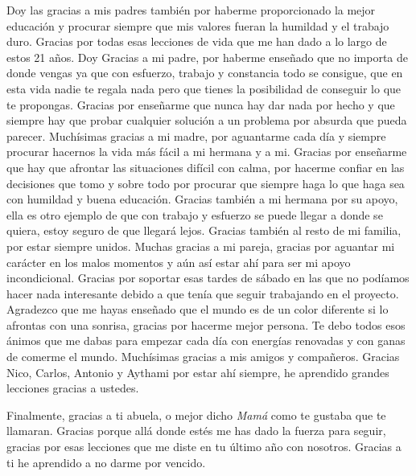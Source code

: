 Doy las gracias a mis padres también por haberme proporcionado la mejor educación y procurar siempre que mis valores fueran la humildad y el trabajo duro.
Gracias por todas esas lecciones de vida que me han dado a lo largo de estos 21 años.
Doy Gracias a mi padre, por haberme enseñado que no importa de donde vengas ya que con esfuerzo, trabajo y constancia todo se consigue, que en esta vida nadie te regala nada pero que tienes la posibilidad de conseguir lo que te propongas.
Gracias por enseñarme que nunca hay dar nada por hecho y que siempre hay que probar cualquier solución a un problema por absurda que pueda parecer.
Muchísimas gracias a mi madre, por aguantarme cada día y siempre procurar hacernos la vida más fácil a mi hermana y a mi.
Gracias por enseñarme que hay que afrontar las situaciones difícil con calma, por hacerme confiar en las decisiones que tomo y sobre todo por procurar que siempre haga lo que haga sea con humildad y buena educación.
Gracias también a mi hermana por su apoyo, ella es otro ejemplo de que con trabajo y esfuerzo se puede llegar a donde se quiera, estoy seguro de que llegará lejos.
Gracias también al resto de mi familia, por estar siempre unidos.
Muchas gracias a mi pareja, gracias por aguantar mi carácter en los malos momentos y aún así estar ahí para ser mi apoyo incondicional.
Gracias por soportar esas tardes de sábado en las que no podíamos hacer nada interesante debido a que tenía que seguir trabajando en el proyecto.
Agradezco que me hayas enseñado que el mundo es de un color diferente si lo afrontas con una sonrisa, gracias por hacerme mejor persona.
Te debo todos esos ánimos que me dabas para empezar cada día con energías renovadas y con ganas de comerme el mundo.
Muchísimas gracias a mis amigos y compañeros.
Gracias Nico, Carlos, Antonio y Aythami por estar ahí siempre, he aprendido grandes lecciones gracias a ustedes.

Finalmente, gracias a ti abuela, o mejor dicho \textit{Mamá} como te gustaba que te llamaran.
Gracias porque allá donde estés me has dado la fuerza para seguir, gracias por esas lecciones que me diste en tu último año con nosotros.
Gracias a ti he aprendido a no darme por vencido.

